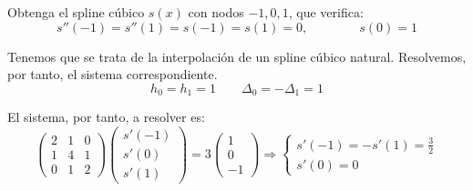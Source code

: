 \begin{ejercicio}
    Obtenga el spline cúbico $s(x)$ con nodos $-1, 0, 1$, que verifica:
    \begin{equation*}
        s''(-1)=s''(1)=s(-1)=s(1)=0,\qquad \qquad s(0)=1
    \end{equation*}

    Tenemos que se trata de la interpolación de un spline cúbico natural. Resolvemos, por tanto, el sistema correspondiente.
    \begin{equation*}
        h_0=h_1 = 1 \qquad \Delta_0 = -\Delta_1= 1
    \end{equation*}

    El sistema, por tanto, a resolver es:
    \begin{equation*}
        \left(\begin{array}{ccc}
            2 & 1 & 0 \\
            1 & 4 & 1 \\
            0 & 1 & 2
        \end{array}\right)
        \left(\begin{array}{c}
            s'(-1) \\ s'(0) \\ s'(1)
        \end{array}\right)
        = 3 \left(\begin{array}{c}
            1 \\ 0 \\ -1
        \end{array}\right) \Longrightarrow \left\{\begin{array}{c}
            s'(-1)=-s'(1)=\frac{3}{2} \\
            s'(0)=0
        \end{array}\right.
    \end{equation*}



\end{ejercicio}
